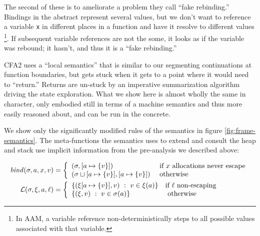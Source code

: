 The second of these is to ameliorate a problem they call ``fake rebinding.''
%
Bindings in the abstract represent several values, but we don't want to reference a variable \texttt{x} in different places in a function and have it resolve to different values
\footnote{In AAM, a variable reference non-deterministically steps to all possible values associated with that variable.}.
%
If subsequent variable references are not the some, it looks as if the variable was rebound; it hasn't, and thus it is a ``fake rebinding.''
%
%

CFA2 uses a ``local semantics'' that is similar to our segmenting continuations at function boundaries, but gets stuck when it gets to a point where it would need to ``return.''
%
Returns are un-stuck by an imperative summarization algorithm driving the state exploration.
%
What we show here is almost wholly the same in character, only embodied still in terms of a machine semantics and thus more easily reasoned about, and can be run in the concrete.

We show only the significantly modified rules of the semantics in figure \ref{fig:frame-semantics}.
%
%
The meta-functions the semantics uses to extend and consult the heap and stack use implicit information from the pre-analysis we described above:

\begin{align*}
  \mathit{bind}(\sigma,a,x,v) &=
   \left\{\begin{array}{ll}
            (\sigma, [a \mapsto \{ v \}]) &\text{ if } x \text{ allocations never escape} \\
            (\sigma\sqcup[a \mapsto \{ v \}], [a \mapsto \{ v \}]) &\text{ otherwise} \\
          \end{array}\right. \\
  {\mathcal L}(\sigma,\xi,a,\ell) &=
    \left\{\begin{array}{ll}
          \{ (\xi[a \mapsto \{ v \}], v)\ :\ v \in \xi(a)\} & \text{if } \ell \text{ non-escaping} \\
          \{ (\xi,v)\ :\ v \in \sigma(a)\} & \text{ otherwise}
           \end{array}\right.
\end{align*}

